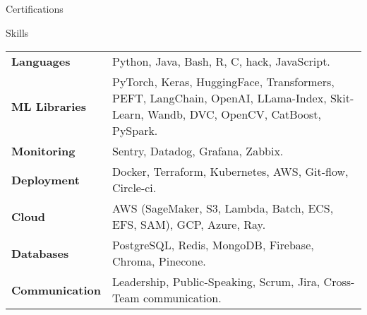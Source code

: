 \documentclass{resume}
\begin{document}
\begin{multicols}{2}
	
	\begin{rSection}{\Large Certifications}
		\begin{description}
			\setlength\itemsep{-0.5em}
			\item[$\bullet$] 
			\item[$\bullet$] 
			\item[$\bullet$] 
			\item[$\bullet$]  
			\item[$\bullet$] 	
		\end{description}
	\end{rSection}

	\begin{rSection}{\Large Skills}
		\noindent
		 \setlength{\tabcolsep}{2pt}
    \begin{tabularx}{0.50\textwidth}{@{\textbullet\hspace{\labelsep}}lX}
        \textbf{Languages} & Python, Java, Bash, R, C, hack, JavaScript. \\
        \textbf{ML Libraries} & PyTorch, Keras, HuggingFace, Transformers, PEFT, LangChain, OpenAI, LLama-Index, Skit-Learn, Wandb, DVC, OpenCV, CatBoost, PySpark. \\
        \textbf{Monitoring} & Sentry, Datadog, Grafana, Zabbix. \\
        \textbf{Deployment} & Docker, Terraform, Kubernetes, AWS, Git-flow, Circle-ci. \\
        \textbf{Cloud} & AWS (SageMaker, S3, Lambda, Batch, ECS, EFS, SAM), GCP, Azure, Ray. \\
        \textbf{Databases} & PostgreSQL, Redis, MongoDB, Firebase, Chroma, Pinecone. \\
        \textbf{Communication} & Leadership, Public-Speaking, Scrum, Jira, Cross-Team communication. \\
    \end{tabularx}
	\end{rSection}


\end{multicols}
\end{document}
